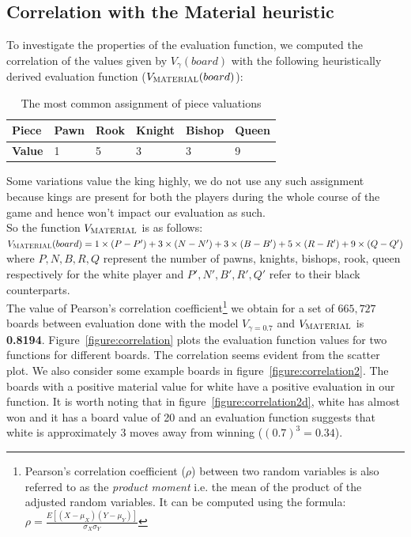 \subsection{Correlation with the Material heuristic}
\label{subsection:correlation}
To investigate the properties of the evaluation function, we computed the 
correlation of the values given by $V_\gamma(board)$ with the following 
heuristically derived evaluation function ($V_{\textsc{MATERIAL}}(board)$):
\begin{table}[H]
\centering
\begin{tabular}{@{}llllll@{}}
\toprule
{\bf Piece} & Pawn & Rook & Knight  & Bishop & Queen \\ \midrule
{\bf Value} & 1    & 5    & 3	    & 3      & 9     \\ \bottomrule
\end{tabular}
\caption{The most common assignment of piece valuations}
\end{table}
Some variations value the king highly, we do not use any such assignment 
because kings are present for both the players during the whole course of the 
game and hence won't impact our evaluation as such.\\

So the function $V_{\textsc{MATERIAL}}$ is as follows:\\
$V_{\textsc{MATERIAL}}(board) = 1 \times (P-P') + 3 \times (N-N')+ 3 \times 
(B-B') + 5 
\times (R-R')+ 9 \times (Q-Q')$\\
\hspace{0.25in}where $P, N, B, R, Q$ represent the number of pawns, knights, 
bishops, rook, queen respectively for the white player and $P', N', B', R', Q'$ 
refer to their black counterparts.\\

The value of Pearson's correlation coefficient\footnote{Pearson's 
correlation coefficient ($\rho$) between two random variables is also 
referred to as the \textit{product moment} i.e. the mean of the product of the 
adjusted random variables. It can be computed using the formula: $\rho = 
\frac{E[(X-\mu_X)(Y-\mu_Y)]}{\sigma_X\sigma_Y}$
} we obtain for a set of $665,727$ boards between evaluation done with the 
model 
$V_{\gamma=0.7}$ and $V_{\textsc{MATERIAL}}$ is \textbf{0.8194}. 
Figure~\ref{figure:correlation} plots the evaluation function values for two 
functions 
for different boards. The correlation seems evident from the scatter plot. We 
also consider some example boards in figure~\ref{figure:correlation2}. The 
boards with a positive material value for white have a positive evaluation in 
our function. It is worth noting that in figure~\ref{figure:correlation2d}, 
white has almost won and it has a board value of 20 and an evaluation function 
suggests that white is approximately 3 moves away from winning ($(0.7)^3 = 
0.34$).\\

